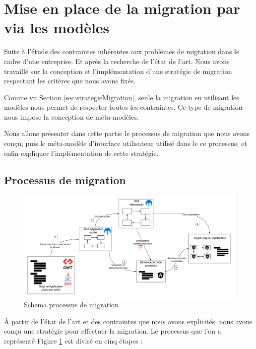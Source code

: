 \documentclass[11pt,]{article}
\begin{document}
\newpage

\hypertarget{mise-en-place-de-la-migration-par-via-les-moduxe8les}{%
\section{Mise en place de la migration par via les
modèles}\label{mise-en-place-de-la-migration-par-via-les-moduxe8les}}

Suite à l'étude des contraintes inhérentes aux problèmes de migration
dans le cadre d'une entreprise. Et après la recherche de l'état de
l'art. Nous avons travaillé sur la conception et l'implémentation d'une
stratégie de migration respectant les critères que nous avons fixés.

Comme vu Section \ref{sec:strategieMigration}, seule la migration en
utilisant les modèles nous permet de respecter toutes les contraintes.
Ce type de migration nous impose la conception de méta-modèles.

Nous allons présenter dans cette partie le processus de migration que
nous avons conçu, puis le méta-modèle d'interface utilisateur utilisé
dans le ce processus, et enfin expliquer l'implémentation de cette
stratégie.

\hypertarget{sec:processusMigration}{%
\subsection{Processus de migration}\label{sec:processusMigration}}

\hypertarget{fig:processusMigration}{%
\begin{figure}
\centering
\includegraphics[width=1\textwidth,height=\textheight]{figures/processusMigration.png}
\caption{Schema processus de migration}\label{fig:processusMigration}
\end{figure}
}

À partir de l'état de l'art et des contraintes que nous avons
explicités, nous avons conçu une stratégie pour effectuer la migration.
Le processus que l'on a représenté Figure \ref{fig:processusMigration}
est divisé en cinq étapes :
\end{document}
